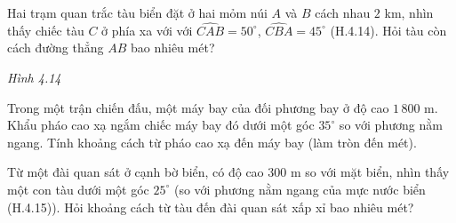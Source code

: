 
\begin{practice}
    \begin{questions}[resume=SBT]
        \item Hai trạm quan trắc tàu biển đặt ở hai mỏm núi $A$ và $B$ cách nhau $2$ km, nhìn thấy chiếc tàu $C$ ở phía xa với với $\widehat{CAB}=50^\circ$, $\widehat{CBA}=45^\circ$ (H.4.14). Hỏi tàu còn cách đường thẳng $AB$ bao nhiêu mét?

        \begin{center}

            \textit{Hình 4.14}
        \end{center}

        \answerline
        \answerline
        \answerline

        \item Trong một trận chiến đấu, một máy bay của đối phương bay ở độ cao $1\,800$ m. Khẩu pháo cao xạ ngắm chiếc máy bay đó dưới một góc $35^\circ$ so với phương nằm ngang. Tính khoảng cách từ pháo cao xạ đến máy bay (làm tròn đến mét).

        \answerline
        \answerline
        \answerline

        \item Từ một đài quan sát ở cạnh bờ biển, có độ cao $300$ m so với mặt biển, nhìn thấy một con tàu dưới một góc $25^\circ$ (so với phương nằm ngang của mực nước biển (H.4.15)). Hỏi khoảng cách từ tàu đến đài quan sát xấp xỉ bao nhiêu mét?

        \begin{center}


\end{center}
\end{questions}
\end{practice}
